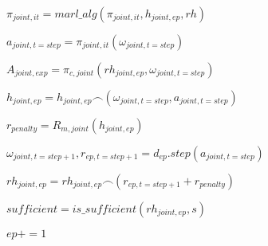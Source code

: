 \begin{algorithm}[hbt!]
{{            

            $\pi_{joint,it} = marl\_alg(\pi_{joint,it},h_{joint,ep}, rh)$


            $a_{joint,t=step} = \pi_{joint,it}(\omega_{joint,t=step})$

            $A_{joint,exp} = \pi_{c,joint}(rh_{joint,ep}, \omega_{joint,t=step})$



            $h_{joint,ep} = h_{joint,ep} \frown (\omega_{joint,t=step}, a_{joint,t=step})$


            $r_{penalty} = R_{m,joint}(h_{joint,ep})$


            $\omega_{joint,t=step+1}, r_{ep,t=step+1} = d_{ep}.step(a_{joint,t=step})$


            $rh_{joint,ep} = rh_{joint,ep} \frown (r_{ep,t=step+1} + r_{ penalty})$

        }

        $sufficient = is\_sufficient(rh_{joint,ep}, s)$

        $ep += 1$
    }

\end{algorithm}
